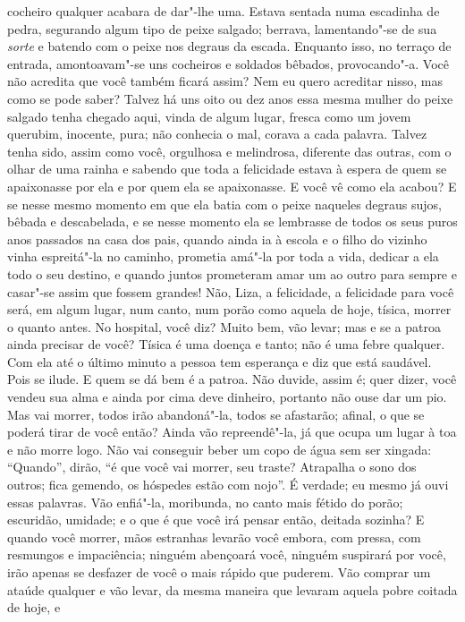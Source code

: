 cocheiro qualquer acabara de dar"-lhe uma. Estava sentada numa escadinha
de pedra, segurando algum tipo de peixe salgado; berrava, lamentando"-se
de sua \textit{sorte} e batendo com o peixe nos degraus da escada. Enquanto
isso, no terraço de entrada, amontoavam"-se uns cocheiros e soldados
bêbados, provocando"-a. Você não acredita que você também ficará assim?
Nem eu quero acreditar nisso, mas como se pode saber? Talvez há uns oito
ou dez anos essa mesma mulher do peixe salgado tenha chegado aqui,
vinda de algum lugar, fresca como um jovem querubim, inocente, pura;
não conhecia o mal, corava a cada palavra. Talvez tenha sido, assim
como você, orgulhosa e melindrosa, diferente das outras, com o olhar de
uma rainha e sabendo que toda a felicidade estava à espera de quem se
apaixonasse por ela e por quem ela se apaixonasse. E você vê como ela
acabou? E se nesse mesmo momento em que ela batia com o peixe naqueles
degraus sujos, bêbada e descabelada, e se nesse momento ela se
lembrasse de todos os seus puros anos passados na casa dos pais, quando
ainda ia à escola e o filho do vizinho vinha espreitá"-la no caminho,
prometia amá"-la por toda a vida, dedicar a ela todo o seu destino, e
quando juntos prometeram amar um ao outro para sempre e casar"-se assim
que fossem grandes! Não, Liza, a felicidade, a felicidade para você
será, em algum lugar, num canto, num porão como aquela de hoje, tísica,
morrer o quanto antes. No hospital, você diz? Muito bem, vão levar; mas
e se a patroa ainda precisar de você? Tísica é uma doença e tanto; não
é uma febre qualquer. Com ela até o último minuto a pessoa tem
esperança e diz que está saudável. Pois se ilude. E quem se dá bem é a
patroa. Não duvide, assim é; quer dizer, você vendeu sua alma e ainda
por cima deve dinheiro, portanto não ouse dar um pio. Mas vai morrer,
todos irão abandoná"-la, todos se afastarão; afinal, o que se poderá
tirar de você então? Ainda vão repreendê"-la, já que ocupa um lugar à
toa e não morre logo. Não vai conseguir beber um copo de água sem ser
xingada: ``Quando'', dirão, ``é que você vai morrer, seu traste? Atrapalha
o sono dos outros; fica gemendo, os hóspedes estão com nojo''. É
verdade; eu mesmo já ouvi essas palavras. Vão enfiá"-la, moribunda, no
canto mais fétido do porão; escuridão, umidade; e o que é que você irá
pensar então, deitada sozinha? E quando você morrer, mãos estranhas
levarão você embora, com pressa, com resmungos e impaciência; ninguém
abençoará você, ninguém suspirará por você, irão apenas se desfazer de
você o mais rápido que puderem. Vão comprar um ataúde qualquer e vão
levar, da mesma maneira que levaram aquela pobre coitada de hoje, e
